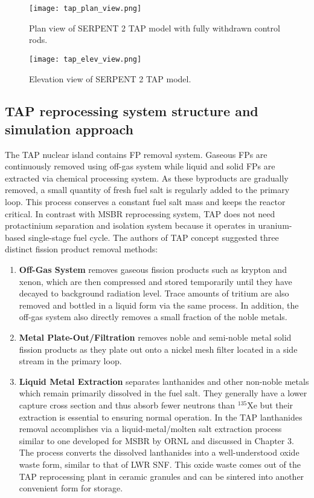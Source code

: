 \begin{figure}[htp!] %
  \centering
		  \texttt{[image: tap\_plan\_view.png]}
  \caption{Plan view of SERPENT 2 \gls{TAP} model with fully withdrawn control rods.}
  \label{fig:tap-serpent-plan}
\end{figure}
\begin{figure}[htp!] %
  \centering
		  \texttt{[image: tap\_elev\_view.png]}
  \caption{Elevation view of SERPENT 2 \gls{TAP} model.}
  \label{fig:tap-serpent-elev}
\end{figure}

\subsection{TAP reprocessing system structure and simulation approach}
The \gls{TAP} nuclear island contains \gls{FP} removal system. Gaseous \glspl{FP} are 
continuously removed using off-gas system while liquid and solid \glspl{FP} are extracted 
via chemical processing system. As these byproducts are gradually removed, a small quantity 
of fresh fuel salt is regularly added to the primary loop. This process conserves a 
constant fuel salt mass and keeps the reactor critical. In contrast with \gls{MSBR} 
reprocessing system, \gls{TAP} does not need protactinium separation and isolation 
system because it operates in uranium-based single-stage fuel cycle. The authors of 
\gls{TAP} concept suggested three distinct fission product removal methods: 
\begin{enumerate}
	\item \textbf{Off-Gas System} removes gaseous fission products such as krypton 
and xenon, 
which are then compressed and stored temporarily until they have decayed to background 
radiation level. Trace amounts of tritium are also removed and bottled in a liquid form 
via the same process. In addition, the off-gas system also directly removes a small 
fraction of the noble metals.
	\item \textbf{Metal Plate-Out/Filtration} removes noble and semi-noble metal 
solid fission 
products as they plate out onto a nickel mesh filter located in a side stream in the 
primary loop.
	\item \textbf{Liquid Metal Extraction} separates lanthanides and other non-noble 
metals which 
remain primarily dissolved in the fuel salt. They generally have a lower capture cross 
section and thus absorb fewer neutrons than $^{135}$Xe but their extraction is essential 
to ensuring normal operation. In the \gls{TAP} lanthanides removal accomplishes via 
a liquid-metal/molten salt extraction process similar to one developed for \gls{MSBR} 
by \gls{ORNL} \cite{robertson_conceptual_1971} and discussed in Chapter 3. The process 
converts the dissolved lanthanides into a well-understood oxide waste form, similar to 
that of \gls{LWR} \gls{SNF}. This oxide waste comes out of the \gls{TAP} reprocessing 
plant in ceramic granules and can be sintered into another convenient form for storage.
\end{enumerate}

